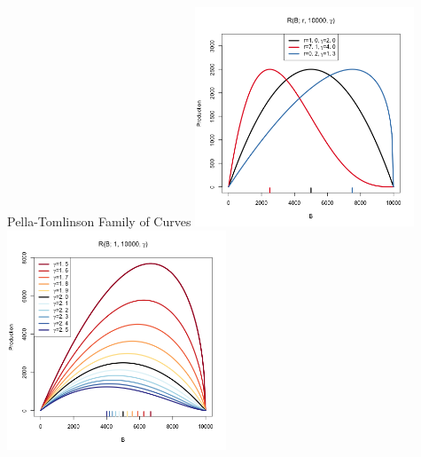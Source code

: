 \documentclass[ xcolor = pdftex, dvipsnames, table ]{beamer}
\begin{document}
{%
\begin{frame}{Pella-Tomlinson Family of Curves}
\includegraphics[width=0.49\textwidth]{srr1.1.png}
\includegraphics[width=0.49\textwidth]{srr2.png}
\end{frame}

}
\end{document}
